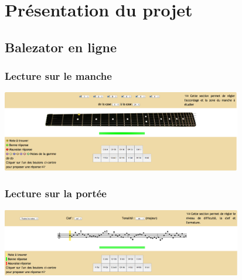 \author{Adrien Ferreira, Alexandra Hospital}


\date{26 mars 2015}





   \begin{frame}

      \titlepage

   \end{frame}






\section{Présentation du projet}

	\subsection{Balezator en ligne}

	\begin{frame}

		\frametitle{Lecture sur le manche}
			\includegraphics[width=10.5cm]{images/balezator_manche.png}
	\end{frame}

	\begin{frame}

		\frametitle{Lecture sur la portée}
			\includegraphics[width=10.5cm]{images/balezator_portee.png}

	\end{frame}



